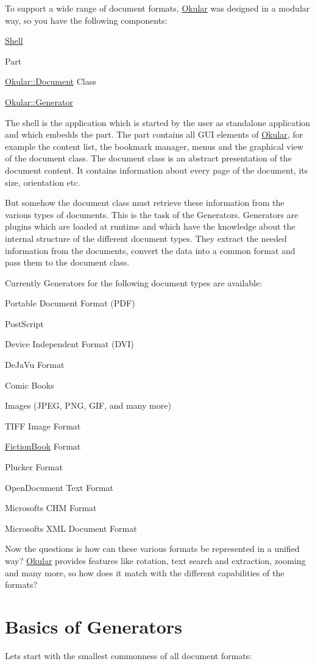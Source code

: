 To support a wide range of document formats, \hyperlink{namespaceOkular}{Okular} was designed in a modular way, so you have the following components\+:

\begin{DoxyItemize}
\item \hyperlink{classShell}{Shell} \item Part \item \hyperlink{classOkular_1_1Document}{Okular\+::\+Document} Class \item \hyperlink{classOkular_1_1Generator}{Okular\+::\+Generator}\end{DoxyItemize}
The shell is the application which is started by the user as standalone application and which embedds the part. The part contains all G\+U\+I elements of \hyperlink{namespaceOkular}{Okular}, for example the content list, the bookmark manager, menus and the graphical view of the document class. The document class is an abstract presentation of the document content. It contains information about every page of the document, its size, orientation etc.

But somehow the document class must retrieve these information from the various types of documents. This is the task of the Generators. Generators are plugins which are loaded at runtime and which have the knowledge about the internal structure of the different document types. They extract the needed information from the documents, convert the data into a common format and pass them to the document class.

Currently Generators for the following document types are available\+:

\begin{DoxyItemize}
\item Portable Document Format (P\+D\+F) \item Post\+Script \item Device Independent Format (D\+V\+I) \item De\+Ja\+Vu Format \item Comic Books \item Images (J\+P\+E\+G, P\+N\+G, G\+I\+F, and many more) \item T\+I\+F\+F Image Format \item \hyperlink{namespaceFictionBook}{Fiction\+Book} Format \item Plucker Format \item Open\+Document Text Format \item Microsofts C\+H\+M Format \item Microsofts X\+M\+L Document Format\end{DoxyItemize}
Now the questions is how can these various formats be represented in a unified way? \hyperlink{namespaceOkular}{Okular} provides features like rotation, text search and extraction, zooming and many more, so how does it match with the different capabilities of the formats?\hypertarget{okular_design_okular_design_basics}{}\section{Basics of Generators}\label{okular_design_okular_design_basics}
Lets start with the smallest commonness of all document formats\+:

